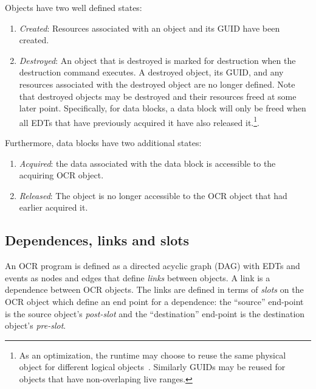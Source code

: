Objects have two well defined states:
\begin{enumerate}
\item \emph{Created}: Resources associated with an object and its GUID
have been created.
\item \emph{Destroyed}: An object that is destroyed is marked for
destruction when the destruction command executes. A destroyed object, its GUID,
and any resources associated with the destroyed object are no longer
defined. Note that destroyed objects may be destroyed and their
resources freed at some later point. Specifically, for data blocks, a
data block will only be freed when all EDTs that have previously
acquired it have also released it.\footnote{As
an optimization, the runtime may choose to reuse the same physical
object for different logical objects~\cite{USBCSS12,SbKS12}. Similarly
GUIDs may be reused for objects that have non-overlaping live ranges.}.
\end{enumerate}
Furthermore, data blocks have two additional states:
\begin{enumerate}
\item \emph{Acquired}: the data associated with the data block is
accessible to the acquiring OCR object.
\item \emph{Released}: The object is no longer accessible to the OCR
object that had earlier acquired it.
\end{enumerate}


\subsection{Dependences, links and slots}
\label{sec:OCRlinks}

An OCR program is defined as a directed acyclic graph (DAG)
with EDTs and events as nodes and edges that define
\emph{links} between objects. A link is a dependence
between OCR objects. The links are defined in terms of
\emph{slots} on the OCR object which define an end
point for a dependence: the ``source'' end-point is the source object's
\emph{post-slot} and the ``destination'' end-point is the destination
object's \emph{pre-slot}.

